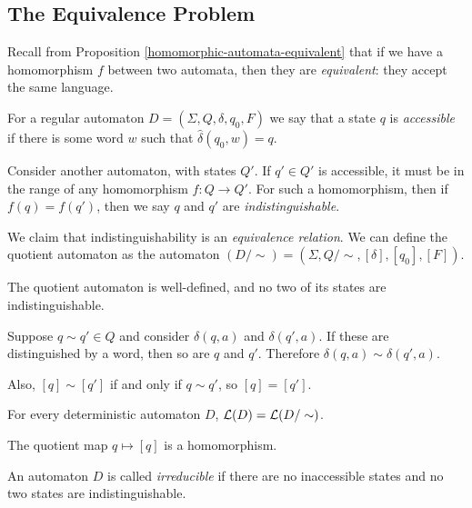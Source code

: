 \documentclass{article}
\begin{document}
\subsection{The Equivalence Problem}

Recall from Proposition \ref{homomorphic-automata-equivalent} that if we have a homomorphism $f$ between two automata, then they are \textit{equivalent}: they accept the same language.

\begin{definition}
	For a regular automaton $D = (\Sigma, Q, \delta, q_0, F)$ we say that a state $q$ is \textit{accessible} if there is some word $w$ such that $\hat{\delta}(q_0, w) = q$.
	    
	Consider another automaton, with states $Q'$. If $q' \in Q'$ is accessible, it must be in the range of any homomorphism $f : Q \to Q'$. For such a homomorphism, then if $f(q) = f(q')$, then we say $q$ and $q'$ are \textit{indistinguishable}.
\end{definition}

We claim that indistinguishability is an \textit{equivalence relation}. We can define the quotient automaton as the automaton $(D/\sim) = (\Sigma, Q/\sim, [\delta], [q_0], [F])$.

\begin{proposition}
	The quotient automaton is well-defined, and no two of its states are indistinguishable.    
\end{proposition}

\begin{prf}
	Suppose $q \sim q' \in Q$ and consider $\delta(q, a)$ and $\delta(q', a)$. If these are distinguished by a word, then so are $q$ and $q'$. Therefore $\delta(q, a) \sim \delta(q', a)$.
	    
	Also, $[q] \sim [q']$ if and only if $q \sim q'$, so $[q] = [q']$.
\end{prf}

\begin{corollary}
	For every deterministic automaton $D$, $\mathcal{L}(D) = \mathcal{L}(D / \sim)$.
\end{corollary}

\begin{prf}
	The quotient map $q \mapsto [q]$ is a homomorphism.
\end{prf}

\begin{definition}[Irreducible]
	An automaton $D$ is called \textit{irreducible} if there are no inaccessible states and no two states are indistinguishable.
\end{definition}
\end{document}
